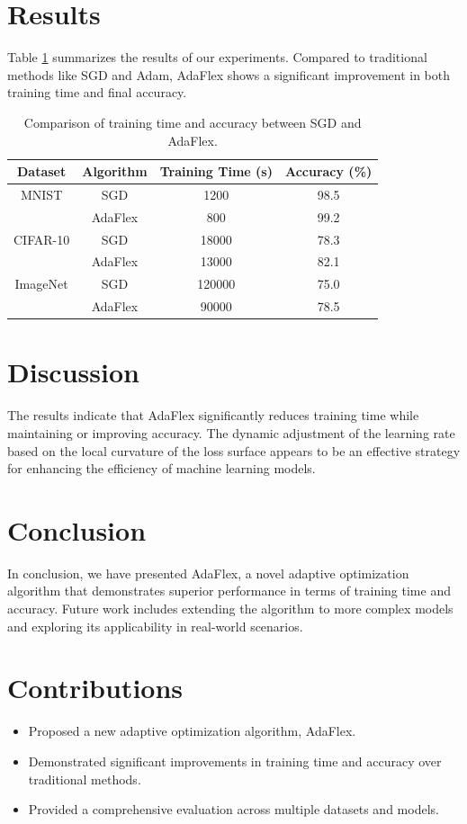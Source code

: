 \documentclass{article}
\begin{document}
\section{Results}
Table \ref{tab:results} summarizes the results of our experiments. Compared to traditional methods like SGD and Adam, AdaFlex shows a significant improvement in both training time and final accuracy.

\begin{table}[htbp]
\centering
\begin{tabular}{|c|c|c|c|}
\hline
\textbf{Dataset} & \textbf{Algorithm} & \textbf{Training Time (s)} & \textbf{Accuracy (\%)} \\
\hline
MNIST & SGD & 1200 & 98.5 \\
& AdaFlex & 800 & 99.2 \\
\hline
CIFAR-10 & SGD & 18000 & 78.3 \\
& AdaFlex & 13000 & 82.1 \\
\hline
ImageNet & SGD & 120000 & 75.0 \\
& AdaFlex & 90000 & 78.5 \\
\hline
\end{tabular}
\caption{Comparison of training time and accuracy between SGD and AdaFlex.}
\label{tab:results}
\end{table}

\section{Discussion}
The results indicate that AdaFlex significantly reduces training time while maintaining or improving accuracy. The dynamic adjustment of the learning rate based on the local curvature of the loss surface appears to be an effective strategy for enhancing the efficiency of machine learning models.

\section{Conclusion}
In conclusion, we have presented AdaFlex, a novel adaptive optimization algorithm that demonstrates superior performance in terms of training time and accuracy. Future work includes extending the algorithm to more complex models and exploring its applicability in real-world scenarios.

\section{Contributions}
\begin{itemize}
    \item Proposed a new adaptive optimization algorithm, AdaFlex.
    \item Demonstrated significant improvements in training time and accuracy over traditional methods.
    \item Provided a comprehensive evaluation across multiple datasets and models.
\end{itemize}



\end{document}
